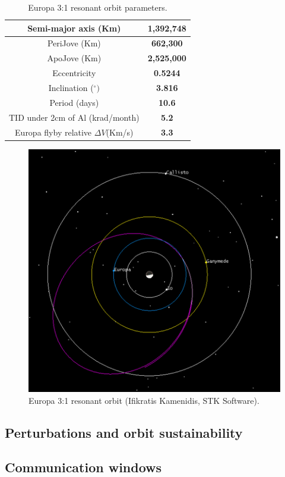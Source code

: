 \begin{table}[h!]
  \centering
    \begin{tabular}{|c|c|}
    \hline
    Semi-major axis (Km) & \textbf{1,392,748} \bigstrut\\
    \hline
    PeriJove (Km) & \textbf{662,300} \bigstrut\\
    \hline
    ApoJove (Km) & \textbf{2,525,000} \bigstrut\\
    \hline
    Eccentricity & \textbf{0.5244} \bigstrut\\
    \hline
    Inclination ($^\circ)$ & \textbf{3.816} \bigstrut\\
    \hline
    Period (days) & \textbf{10.6} \bigstrut\\
    \hline
    TID under 2cm of Al (krad/month) & \textbf{5.2} \bigstrut\\
    \hline
    Europa flyby relative $\Delta V$(Km/s) & \textbf{3.3} \bigstrut\\
    \hline
    \end{tabular}%
    \caption{Europa 3:1 resonant orbit parameters.}
  \label{tab:eurorb}%
\end{table}%
\begin{figure}[h!]
\centering
\includegraphics[scale=1]{figures/Orbiter/europares.png}
\caption{Europa 3:1 resonant orbit (Ifikratis Kamenidis, STK Software).}
\end{figure}
\subsection{Perturbations and orbit sustainability}
\subsection{Communication windows}
